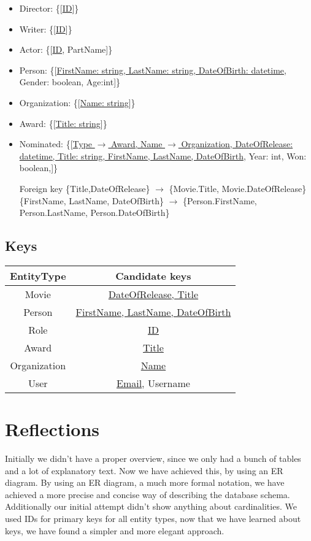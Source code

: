 \begin{itemize}
\item Director: \{[\underline{ID}]\}

\item Writer: \{[\underline{ID}]\}

\item Actor: \{[\underline{ID}, PartName]\}

\item Person: \{[\underline{FirstName: string, LastName: string, DateOfBirth: datetime}, Gender: boolean, Age:int]\}

\item Organization: \{[\underline{Name: string}]\}

\item Award: \{[\underline{Title: string}]\}

\item Nominated: \{[\underline{Type $ \rightarrow $ Award, Name $ \rightarrow $ Organization, DateOfRelease: datetime, Title: string, FirstName, LastName, DateOfBirth}, Year: int, Won: boolean,]\}

Foreign key \{Title,DateOfRelease\} $ \rightarrow $ \{Movie.Title, Movie.DateOfRelease\}
		\{FirstName, LastName, DateOfBirth\} $ \rightarrow $ \{Person.FirstName, Person.LastName, 
Person.DateOfBirth\}
\end{itemize}

\subsection{Keys}

\begin{tabular}{| c | c |}
\hline
EntityType & Candidate keys\\
\hline 
\hline
Movie & \underline{DateOfRelease, Title}\\
\hline
Person & \underline{FirstName, LastName, DateOfBirth}\\
\hline
Role & \underline{ID}\\
\hline
\hline 
Award & \underline{Title}\\
\hline
Organization & \underline{Name}\\
\hline
User & \underline{Email}, Username\\
\hline
\end{tabular}

\section{Reflections}
Initially we didn't have a proper overview, since we only had a bunch of tables and a lot of explanatory text.
Now we have achieved this, by using an ER diagram.
By using an ER diagram, a much more formal notation, we have achieved a more precise and concise way of describing the database schema.
Additionally our initial attempt didn't show anything about cardinalities.
We used IDs for primary keys for all entity types, now that we have learned about keys, we have found a simpler and more elegant approach.
